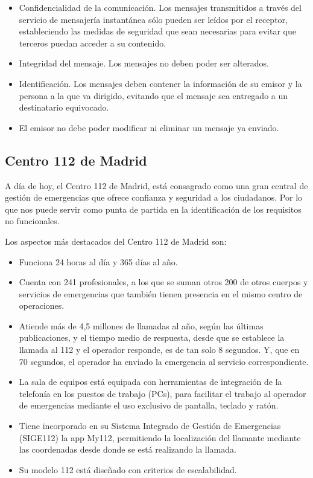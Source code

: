 \begin{itemize}
  \item Confidencialidad de la comunicación. Los mensajes transmitidos a través del servicio de mensajería instantánea sólo pueden ser leídos por el receptor, estableciendo las medidas de seguridad que sean necesarias para evitar que terceros puedan acceder a su contenido.
  \item Integridad del mensaje. Los mensajes no deben poder ser alterados.
  \item Identificación. Los mensajes deben contener la información de su emisor y la persona a la que va dirigido, evitando que el mensaje sea entregado a un destinatario equivocado.
  \item El emisor no debe poder modificar ni eliminar un mensaje ya enviado.
\end{itemize}

\subsection{Centro 112 de Madrid}

A día de hoy, el Centro 112 de Madrid, está consagrado como una gran central de gestión de emergencias que ofrece confianza y seguridad a los ciudadanos. Por lo que nos puede servir como punta de partida en la identificación de los requisitos no funcionales.

Los aspectos más destacados del Centro 112 de Madrid son:

\begin{itemize}
  \item Funciona 24 horas al día y 365 días al año.
  \item Cuenta con 241 profesionales, a los que se suman otros 200 de otros cuerpos y servicios de emergencias que también tienen presencia en el mismo centro de operaciones.
  \item Atiende más de 4,5 millones de llamadas al año, según las últimas publicaciones, y el tiempo medio de respuesta, desde que se establece la llamada al 112 y el operador responde, es de tan solo 8 segundos. Y, que en 70 segundos, el operador ha enviado la emergencia al servicio correspondiente.
  \item La sala de equipos está equipada con herramientas de integración de la telefonía en los puestos de trabajo (PCs), para facilitar el trabajo al operador de emergencias mediante el uso exclusivo de pantalla, teclado y ratón.
  \item Tiene incorporado en su Sistema Integrado de Gestión de Emergencias (SIGE112) la app My112, permitiendo la localización del llamante mediante las coordenadas desde donde se está realizando la llamada.
  \item Su modelo 112 está diseñado con criterios de escalabilidad.
\end{itemize}

